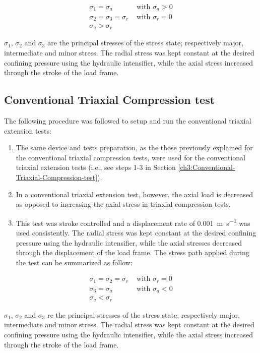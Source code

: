 \begin{align}
    \sigma_1 = \sigma_a &\text{ with } \sigma_a > 0 \\
    \sigma_2 = \sigma_3 = \sigma_r   &\text{ with } \sigma_r = 0 \\
    \sigma_a > \sigma_r &
\end{align}

$\sigma_1$, $\sigma_2$  and $\sigma_3$ are the principal stresses of the stress state; respectively major, intermediate and minor stress. The radial stress was kept constant at the desired confining pressure using the hydraulic intensifier, while the axial stress increased through the stroke of the load frame. 

\subsection{Conventional Triaxial Compression test}

The following procedure was followed to setup and run the conventional triaxial extension tests:

\begin{enumerate}
    \item The same device and tests preparation, as the those previously explained for the conventional triaxial compression tests, were used for the conventional triaxial extension tests (i.e., see steps 1-3 in Section \ref{ch3:Conventional-Triaxial-Compression-test}).
    \item In a conventional triaxial extension test, however, the axial load is decreased as opposed to increasing the axial stress in triaxial compression tests. 
    \item This test was stroke controlled and a displacement rate of \SI{0.001}{\meter\per\second} was used consistently. The radial stress was kept constant at the desired confining pressure using the hydraulic intensifier, while the axial stresses decreased through the displacement of the load frame. The stress path applied during the test can be summarized as follow:
\end{enumerate}

\begin{align}
    \sigma_1 = \sigma_2 = \sigma_r   &\text{ with } \sigma_r = 0 \\
    \sigma_3 = \sigma_a &\text{ with } \sigma_a < 0 \\
    \sigma_a < \sigma_r &
\end{align}

$\sigma_1$, $\sigma_2$  and $\sigma_3$ re the principal stresses of the stress state; respectively major, intermediate and minor stress. The radial stress was kept constant at the desired confining pressure using the hydraulic intensifier, while the axial stress increased through the stroke of the load frame. 

